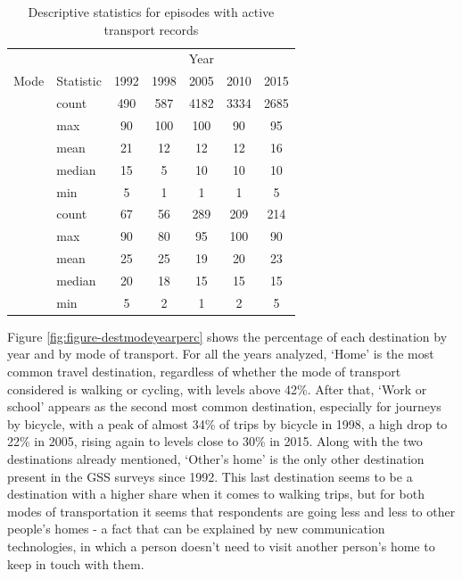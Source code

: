 \documentclass[preprint, 3p,
authoryear]{elsarticle} %
\begin{document}
\begin{longtable}[t]{>{}llccccc}
\caption{\label{tab:table-02}\label{tab:table-02}Descriptive statistics for episodes with active transport records}\\
\toprule
\multicolumn{2}{c}{ } & \multicolumn{5}{c}{Year} \\
\cmidrule(l{3pt}r{3pt}){3-7}
Mode & Statistic & 1992 & 1998 & 2005 & 2010 & 2015\\
\midrule
 & count & 490 & 587 & 4182 & 3334 & 2685\\
\nopagebreak
 & max & 90 & 100 & 100 & 90 & 95\\
\nopagebreak
 & mean & 21 & 12 & 12 & 12 & 16\\
\nopagebreak
 & median & 15 & 5 & 10 & 10 & 10\\
\nopagebreak
\multirow[t]{-5}{*}{\raggedright\arraybackslash \textbf{Walking}} & min & 5 & 1 & 1 & 1 & 5\\
\cmidrule{1-7}\pagebreak[0]
 & count & 67 & 56 & 289 & 209 & 214\\
\nopagebreak
 & max & 90 & 80 & 95 & 100 & 90\\
\nopagebreak
 & mean & 25 & 25 & 19 & 20 & 23\\
\nopagebreak
 & median & 20 & 18 & 15 & 15 & 15\\
\nopagebreak
\multirow[t]{-5}{*}{\raggedright\arraybackslash \textbf{Cycling}} & min & 5 & 2 & 1 & 2 & 5\\
\bottomrule
\end{longtable}
\endgroup{}

Figure \ref{fig:figure-destmodeyearperc} shows the percentage of each
destination by year and by mode of transport. For all the years
analyzed, `Home' is the most common travel destination, regardless of
whether the mode of transport considered is walking or cycling, with
levels above 42\%. After that, `Work or school' appears as the second
most common destination, especially for journeys by bicycle, with a peak
of almost 34\% of trips by bicycle in 1998, a high drop to 22\% in 2005,
rising again to levels close to 30\% in 2015. Along with the two
destinations already mentioned, `Other's home' is the only other
destination present in the GSS surveys since 1992. This last destination
seems to be a destination with a higher share when it comes to walking
trips, but for both modes of transportation it seems that respondents
are going less and less to other people's homes - a fact that can be
explained by new communication technologies, in which a person doesn't
need to visit another person's home to keep in touch with them.
\end{document}
